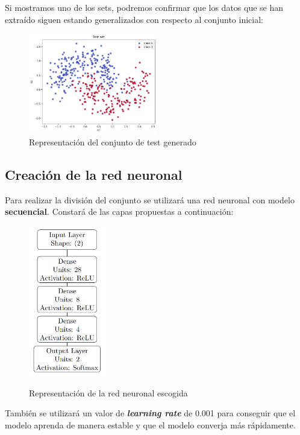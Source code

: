 \documentclass[paper=a4, fontsize=11pt]{scrartcl} %
\numberwithin{equation}{section} %
\numberwithin{figure}{section} %
\numberwithin{table}{section} %
\begin{document}
Si mostramos uno de los sets, podremos confirmar que los datos que se han extraído siguen estando generalizados con respecto al conjunto inicial:

\begin{figure}[H]
\centering
\includegraphics[width=0.5\textwidth]{images/test_output.png}
\caption{Representación del conjunto de test generado}
\end{figure}

\subsection{Creación de la red neuronal}

Para realizar la división del conjunto se utilizará una red neuronal con modelo \textbf{secuencial}. Constará de las capas propuestas a continuación:

\begin{figure}[H]
\centering
\includegraphics[width=0.3\textwidth]{images/graph.png}
\label{fig:graph}
\caption{Representación de la red neuronal escogida}
\end{figure}

También se utilizará un valor de \textbf{\textit{learning rate}} de 0.001 para conseguir que el modelo aprenda de manera estable y que el modelo converja más rápidamente.
\end{document}

